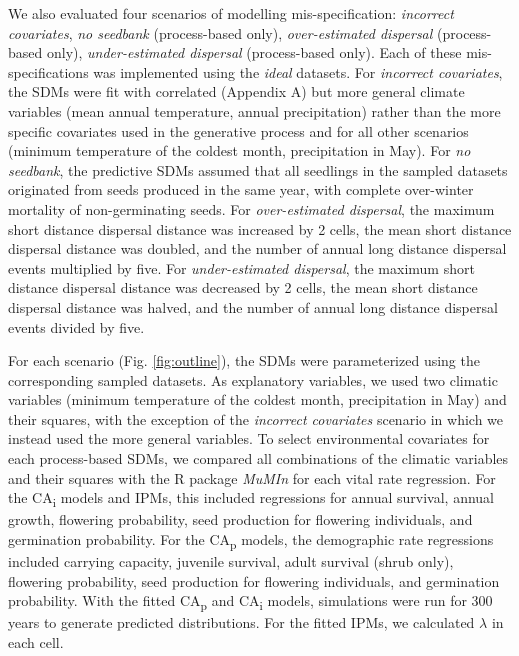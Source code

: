 \documentclass[preprint,review,times,12pt]{elsarticle}
\begin{document}
We also evaluated four scenarios of modelling mis-specification: \emph{incorrect covariates}, \emph{no seedbank} (process-based only), \emph{over-estimated dispersal} (process-based only), \emph{under-estimated dispersal} (process-based only). Each of these mis-specifications was implemented using the \emph{ideal} datasets. For \emph{incorrect covariates}, the SDMs were fit with correlated (Appendix A) but more general climate variables (mean annual temperature, annual precipitation) rather than the more specific covariates used in the generative process and for all other scenarios (minimum temperature of the coldest month, precipitation in May). For \emph{no seedbank}, the predictive SDMs assumed that all seedlings in the sampled datasets originated from seeds produced in the same year, with complete over-winter mortality of non-germinating seeds. For \emph{over-estimated dispersal}, the maximum short distance dispersal distance was increased by 2 cells, the mean short distance dispersal distance was doubled, and the number of annual long distance dispersal events multiplied by five. For \emph{under-estimated dispersal}, the maximum short distance dispersal distance was decreased by 2 cells, the mean short distance dispersal distance was halved, and the number of annual long distance dispersal events divided by five.

For each scenario (Fig. \ref{fig:outline}), the SDMs were parameterized using the corresponding sampled datasets. As explanatory variables, we used two climatic variables (minimum temperature of the coldest month, precipitation in May) and their squares, with the exception of the \emph{incorrect covariates} scenario in which we instead used the more general variables. To select environmental covariates for each process-based SDMs, we compared all combinations of the climatic variables and their squares with the R package \emph{MuMIn} for each vital rate regression. For the CA\textsubscript{i} models and IPMs, this included regressions for annual survival, annual growth, flowering probability, seed production for flowering individuals, and germination probability. For the CA\textsubscript{p} models, the demographic rate regressions included carrying capacity, juvenile survival, adult survival (shrub only), flowering probability, seed production for flowering individuals, and germination probability. With the fitted CA\textsubscript{p} and CA\textsubscript{i} models, simulations were run for 300 years to generate predicted distributions. For the fitted IPMs, we calculated $\lambda$ in each cell.
\end{document}
